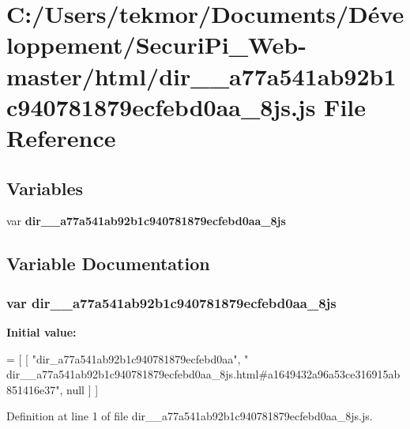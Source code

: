 \section{C\+:/\+Users/tekmor/\+Documents/\+Développement/\+Securi\+Pi\+\_\+\+Web-\/master/html/dir\+\_\+\+\_\+a77a541ab92b1c940781879ecfebd0aa\+\_\+8js.js File Reference}
\label{dir____a77a541ab92b1c940781879ecfebd0aa__8js_8js}
\subsection*{Variables}
\begin{DoxyCompactItemize}
\item 
var {\bf dir\+\_\+\+\_\+a77a541ab92b1c940781879ecfebd0aa\+\_\+8js}
\end{DoxyCompactItemize}


\subsection{Variable Documentation}
\subsubsection[{dir\+\_\+\+\_\+a77a541ab92b1c940781879ecfebd0aa\+\_\+8js}]{\setlength{\rightskip}{0pt plus 5cm}var dir\+\_\+\+\_\+a77a541ab92b1c940781879ecfebd0aa\+\_\+8js}\label{dir____a77a541ab92b1c940781879ecfebd0aa__8js_8js_a2533307f15af829e63db322042e34082}
{\bfseries Initial value\+:}
\begin{DoxyCode}
=
[
    [ \textcolor{stringliteral}{"dir\_a77a541ab92b1c940781879ecfebd0aa"}, \textcolor{stringliteral}{"
      dir\_\_a77a541ab92b1c940781879ecfebd0aa\_8js.html#a1649432a96a53ce316915ab851416e37"}, null ]
]
\end{DoxyCode}


Definition at line 1 of file dir\+\_\+\+\_\+a77a541ab92b1c940781879ecfebd0aa\+\_\+8js.\+js.

